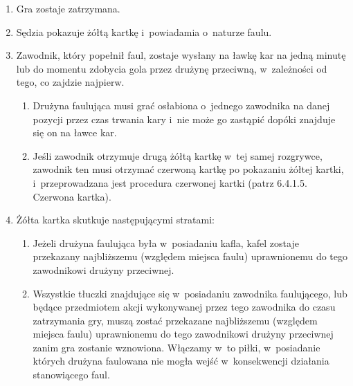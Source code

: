 \documentclass[12pt,a4paper]{article}
\begin{document}
\begin{enumerate}
	\item
	      Gra zostaje zatrzymana.
	\item
	      Sędzia pokazuje żółtą kartkę i~powiadamia o~naturze faulu.
	\item
	      Zawodnik, który popełnił faul, zostaje wysłany na ławkę kar na jedną
	      minutę lub do momentu zdobycia gola przez drużynę przeciwną, w~zależności od tego, co zajdzie najpierw.

	      \begin{enumerate}
		      \item
		            Drużyna faulująca musi grać osłabiona o~jednego zawodnika na danej
		            pozycji przez czas trwania kary i~nie może go zastąpić dopóki
		            znajduje się on na ławce kar.
		      \item
		            Jeśli zawodnik otrzymuje drugą żółtą kartkę w~tej samej rozgrywce,
		            zawodnik ten musi otrzymać czerwoną kartkę po pokazaniu żółtej
		            kartki, i~przeprowadzana jest procedura czerwonej kartki (patrz
		            6.4.1.5. Czerwona kartka).
	      \end{enumerate}
	\item
	      Żółta kartka skutkuje następującymi stratami:

	      \begin{enumerate}
		      \item
		            Jeżeli drużyna faulująca była w~posiadaniu kafla, kafel zostaje
		            przekazany najbliższemu (względem miejsca faulu)
		            uprawnionemu do tego zawodnikowi drużyny przeciwnej.
		      \item
				Wszystkie tłuczki znajdujące się w~posiadaniu zawodnika faulującego, lub
				będące przedmiotem akcji wykonywanej przez tego zawodnika do czasu zatrzymania gry, muszą
				zostać przekazane najbliższemu (względem miejsca faulu) uprawnionemu do tego zawodnikowi drużyny przeciwnej zanim gra
				zostanie wznowiona. Włączamy w~to piłki, w~posiadanie których
				drużyna faulowana nie mogła wejść w~konsekwencji działania
				stanowiącego faul.


\end{enumerate}
\end{enumerate}
\end{document}
